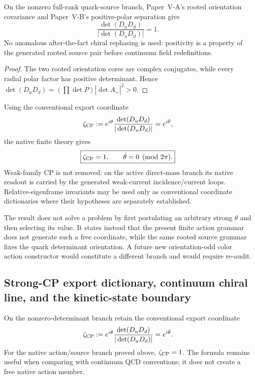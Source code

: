 \documentclass[12pt,a4paper]{article}
\begin{document}
\begin{proposition}
\label{p7v2:prop:physical-strong-cp}
On the nonzero full-rank quark-source branch, Paper~V-A's rooted orientation
covariance and Paper~V-B's positive-polar separation give
\[
 \boxed{\frac{\det(D_uD_d)}{|\det(D_uD_d)|}=1.}
\]
No anomalous after-the-fact chiral rephasing is used: positivity is a property
of the generated rooted source pair before continuum field redefinitions.
\end{proposition}
\begin{proof}
The two rooted orientation cores are complex conjugates, while every radial
polar factor has positive determinant.  Hence
\(\det(D_uD_d)=(\prod\det P)|\det A_+|^2>0\).
\end{proof}

\begin{corollary}
\label{p7v2:cor:v259-native-strong-cp}
Using the conventional export coordinate
\[
 \zeta_{\rm CP}:=e^{i\theta}\frac{\det(D_uD_d)}{|\det(D_uD_d)|}
 =e^{i\bar\theta},
\]
the native finite theory gives
\[
 \boxed{\zeta_{\rm CP}=1,\qquad \bar\theta=0\pmod{2\pi}.}
\]
Weak-family CP is not removed: on the active direct-mass branch its native
readout is carried by the generated weak-current incidence/current loops.
Relative-eigenframe invariants may be used only as conventional coordinate
dictionaries where their hypotheses are separately established.
\end{corollary}

\begin{remark}
The result does not solve a problem by first postulating an arbitrary strong
\(\theta\) and then selecting its value.  It states instead that the present
finite action grammar does not generate such a free coordinate, while the
same rooted source grammar fixes the quark determinant orientation.  A future
new orientation-odd color action constructor would constitute a different
branch and would require re-audit.
\end{remark}


\subsection{Strong-CP export dictionary, continuum chiral line, and the kinetic-state boundary}
\label{p7:sec:cp-kinetic-update}

On the nonzero-determinant branch retain the conventional export coordinate
\begin{equation}
 \label{p7:eq:zeta-cp}
 \zeta_{\rm CP}
 :=e^{i\theta}\frac{\det(D_uD_d)}{|\det(D_uD_d)|}
 =e^{i\bar\theta}.
\end{equation}
For the native action/source branch proved above, \(\zeta_{\rm CP}=1\).
The formula remains useful when comparing with continuum QCD conventions; it
does not create a free native action member.
\end{document}
